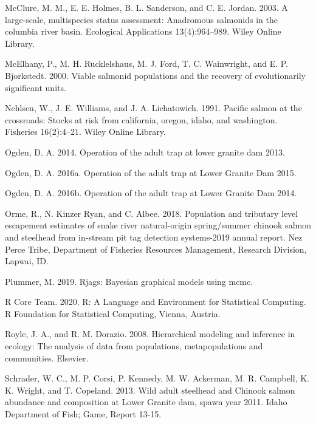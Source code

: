 \documentclass[
  12pt,
]{article}
\begin{document}
\leavevmode\hypertarget{ref-mcclure2003large}{}%
McClure, M. M., E. E. Holmes, B. L. Sanderson, and C. E. Jordan. 2003. A large-scale, multispecies status assessment: Anadromous salmonids in the columbia river basin. Ecological Applications 13(4):964--989. Wiley Online Library.

\leavevmode\hypertarget{ref-mcelhany2000viable}{}%
McElhany, P., M. H. Rucklelshaus, M. J. Ford, T. C. Wainwright, and E. P. Bjorkstedt. 2000. Viable salmonid populations and the recovery of evolutionarily significant units.

\leavevmode\hypertarget{ref-nehlsen1991pacific}{}%
Nehlsen, W., J. E. Williams, and J. A. Lichatowich. 1991. Pacific salmon at the crossroads: Stocks at risk from california, oregon, idaho, and washington. Fisheries 16(2):4--21. Wiley Online Library.

\leavevmode\hypertarget{ref-Ogden2014}{}%
Ogden, D. A. 2014. Operation of the adult trap at lower granite dam 2013.

\leavevmode\hypertarget{ref-Ogden2016b}{}%
Ogden, D. A. 2016a. Operation of the adult trap at Lower Granite Dam 2015.

\leavevmode\hypertarget{ref-Ogden2016}{}%
Ogden, D. A. 2016b. Operation of the adult trap at Lower Granite Dam 2014.

\leavevmode\hypertarget{ref-orme2018population}{}%
Orme, R., N. Kinzer Ryan, and C. Albee. 2018. Population and tributary level escapement estimates of snake river natural-origin spring/summer chinook salmon and steelhead from in-stream pit tag detection systems-2019 annual report. Nez Perce Tribe, Department of Fisheries Resources Management, Research Division, Lapwai, ID.

\leavevmode\hypertarget{ref-R-rjags}{}%
Plummer, M. 2019. Rjags: Bayesian graphical models using mcmc.

\leavevmode\hypertarget{ref-R-Core-Team2020}{}%
R Core Team. 2020. R: A Language and Environment for Statistical Computing. R Foundation for Statistical Computing, Vienna, Austria.

\leavevmode\hypertarget{ref-royle2008hierarchical}{}%
Royle, J. A., and R. M. Dorazio. 2008. Hierarchical modeling and inference in ecology: The analysis of data from populations, metapopulations and communities. Elsevier.

\leavevmode\hypertarget{ref-Schrader2013}{}%
Schrader, W. C., M. P. Corsi, P. Kennedy, M. W. Ackerman, M. R. Campbell, K. K. Wright, and T. Copeland. 2013. Wild adult steelhead and Chinook salmon abundance and composition at Lower Granite dam, spawn year 2011. Idaho Department of Fish; Game, Report 13-15.
\end{document}
